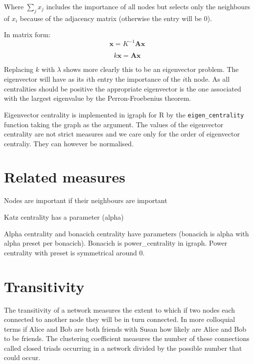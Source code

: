Where $\sum_j x_j$ includes the importance of all nodes but selects only the neighbours of $x_i$ because of the adjacency matrix (otherwise the entry will be 0).

In matrix form:
\begin{equation}
    \mathbf{x}=K^{-1}\mathbf{Ax}
    \end{equation}
    
    \begin{equation}
         k\mathbf{x}=\mathbf{Ax}
    \end{equation}
  
  Replacing $k$ with $\lambda$ shows more clearly this to be an eigenvector problem. The eigenvector will have as its $i$th entry the importance of the $i$th node. As all centralities should be positive the appropriate eigenvector is the one associated with the largest eigenvalue by the Perron-Froebenius theorem. 
  
  Eigenvector centrality is implemented in igraph for R by the \texttt{eigen\_centrality} function taking the graph as the argument. The values of the eigenvector centrality are not strict measures and we care only for the order of eigenvector centraliy. They can however be normalised. 
  
 \section{Related measures}
\cite{bonacich1987power}
Nodes are important if their neighbours are important 

Katz centrality has a parameter (alpha)
    
Alpha centrality and bonacich centrality have parameters (bonacich is alpha with alpha preset per bonacich). Bonacich is power\_centrality in igraph. Power centrality with preset is symmetrical around 0.  





\section{Transitivity}
\label{sec:transitivity}
The transitivity of a network measures the extent to which if two nodes each connected to another node they will be in turn connected. In more colloquial terms if Alice and Bob are both friends with Susan how likely are Alice and Bob to be friends. The clustering coefficient measures the number of these connections called closed triads occurring in a network 
divided by the possible number that could occur.

